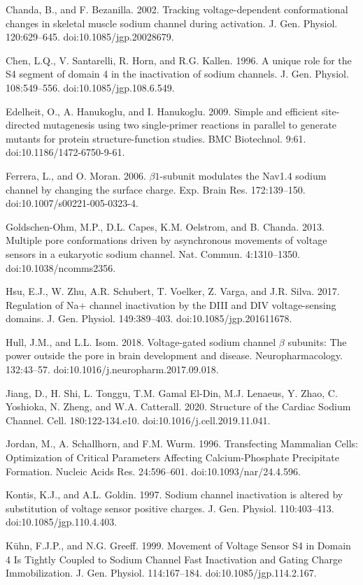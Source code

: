 \begin{hangparas}{.25in}{1}
Chanda, B., and F. Bezanilla. 2002. Tracking voltage-dependent conformational changes in skeletal muscle sodium channel during activation. J. Gen. Physiol. 120:629–645. doi:10.1085/jgp.20028679.

Chen, L.Q., V. Santarelli, R. Horn, and R.G. Kallen. 1996. A unique role for the S4 segment of domain 4 in the inactivation of sodium channels. J. Gen. Physiol. 108:549–556. doi:10.1085/jgp.108.6.549.

Edelheit, O., A. Hanukoglu, and I. Hanukoglu. 2009. Simple and efficient site-directed mutagenesis using two single-primer reactions in parallel to generate mutants for protein structure-function studies. BMC Biotechnol. 9:61. doi:10.1186/1472-6750-9-61.

Ferrera, L., and O. Moran. 2006. $\beta1$-subunit modulates the Nav1.4 sodium channel by changing the surface charge. Exp. Brain Res. 172:139–150. doi:10.1007/s00221-005-0323-4.

Goldschen-Ohm, M.P., D.L. Capes, K.M. Oelstrom, and B. Chanda. 2013. Multiple pore conformations driven by asynchronous movements of voltage sensors in a eukaryotic sodium channel. Nat. Commun. 4:1310–1350. doi:10.1038/ncomms2356.

Hsu, E.J., W. Zhu, A.R. Schubert, T. Voelker, Z. Varga, and J.R. Silva. 2017. Regulation of Na+ channel inactivation by the DIII and DIV voltage-sensing domains. J. Gen. Physiol. 149:389–403. doi:10.1085/jgp.201611678.

Hull, J.M., and L.L. Isom. 2018. Voltage-gated sodium channel $\beta$ subunits: The power outside the pore in brain development and disease. Neuropharmacology. 132:43–57. doi:10.1016/j.neuropharm.2017.09.018.

Jiang, D., H. Shi, L. Tonggu, T.M. Gamal El-Din, M.J. Lenaeus, Y. Zhao, C. Yoshioka, N. Zheng, and W.A. Catterall. 2020. Structure of the Cardiac Sodium Channel. Cell. 180:122-134.e10. doi:10.1016/j.cell.2019.11.041.

Jordan, M., A. Schallhorn, and F.M. Wurm. 1996. Transfecting Mammalian Cells: Optimization of Critical Parameters Affecting Calcium-Phosphate Precipitate Formation. Nucleic Acids Res. 24:596–601. doi:10.1093/nar/24.4.596.

Kontis, K.J., and A.L. Goldin. 1997. Sodium channel inactivation is altered by substitution of voltage sensor positive charges. J. Gen. Physiol. 110:403–413. doi:10.1085/jgp.110.4.403.

Kühn, F.J.P., and N.G. Greeff. 1999. Movement of Voltage Sensor S4 in Domain 4 Is Tightly Coupled to Sodium Channel Fast Inactivation and Gating Charge Immobilization. J. Gen. Physiol. 114:167–184. doi:10.1085/jgp.114.2.167.


\end{hangparas}
